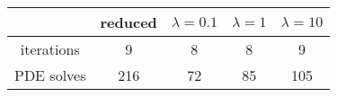 \begin{tabular}{ccccc}
& reduced & $\lambda = 0.1$ & $\lambda = 1$ & $\lambda = 10$ \\
\hline
iterations & 9 & 8 & 8 & 9 \\
PDE solves & 216 & 72 & 85 & 105 \\
\hline
\end{tabular}
